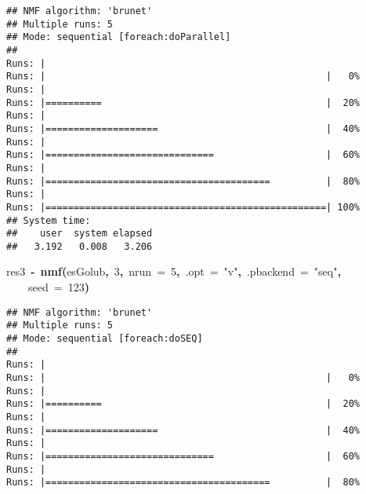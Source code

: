 \documentclass[a4paper]{article}\usepackage{graphicx, color}
\makeatletter
\newcommand{\hlnumber}[1]{\textcolor[rgb]{0,0,0}{#1}}%
\newcommand{\hlfunctioncall}[1]{\textcolor[rgb]{0.501960784313725,0,0.329411764705882}{\textbf{#1}}}%
\newcommand{\hlstring}[1]{\textcolor[rgb]{0.6,0.6,1}{#1}}%
\newcommand{\hlkeyword}[1]{\textcolor[rgb]{0,0,0}{\textbf{#1}}}%
\newcommand{\hlargument}[1]{\textcolor[rgb]{0.690196078431373,0.250980392156863,0.0196078431372549}{#1}}%
\newcommand{\hlassignement}[1]{\textcolor[rgb]{0,0,0}{\textbf{#1}}}%
\newcommand{\hlsymbol}[1]{\textcolor[rgb]{0,0,0}{#1}}%
\newcommand{\hlstd}[1]{\textcolor[rgb]{0,0,0}{#1}}%
\newenvironment{kframe}{%
 \def\FrameCommand##1{\hskip\@totalleftmargin \hskip-\fboxsep
 \colorbox{shadecolor}{##1}\hskip-\fboxsep
     \hskip-\linewidth \hskip-\@totalleftmargin \hskip\columnwidth}%
 \MakeFramed {\advance\hsize-\width
   \@totalleftmargin\z@ \linewidth\hsize
   \@setminipage}}%
 {\par\unskip\endMakeFramed}
\newenvironment{knitrout}{}{} %
\makeatother
\begin{document}
\begin{knitrout}
\begin{kframe}
\begin{flushleft}
\normalfont
\end{flushleft}
\begin{verbatim}
## NMF algorithm: 'brunet'
## Multiple runs: 5
## Mode: sequential [foreach:doParallel]
## 
Runs: |                                                        
Runs: |                                                  |   0%
Runs: |                                                        
Runs: |==========                                        |  20%
Runs: |                                                        
Runs: |====================                              |  40%
Runs: |                                                        
Runs: |==============================                    |  60%
Runs: |                                                        
Runs: |========================================          |  80%
Runs: |                                                        
Runs: |==================================================| 100%
## System time:
##    user  system elapsed 
##   3.192   0.008   3.206 
\end{verbatim}
\begin{flushleft}
\ttfamily\noindent
\hlsymbol{res3}{\ }\hlassignement{\usebox{\hlnormalsizeboxlessthan}-}{\ }\hlfunctioncall{nmf}\hlkeyword{(}\hlsymbol{esGolub}\hlkeyword{,}{\ }\hlnumber{3}\hlkeyword{,}{\ }\hlargument{nrun}{\ }\hlargument{=}{\ }\hlnumber{5}\hlkeyword{,}{\ }\hlargument{.opt}{\ }\hlargument{=}{\ }\hlstring{"{}v"{}}\hlkeyword{,}{\ }\hlargument{.pbackend}{\ }\hlargument{=}{\ }\hlstring{"{}seq"{}}\hlkeyword{,}\hspace*{\fill}\\
\hlstd{}{\ }{\ }{\ }{\ }\hlargument{seed}{\ }\hlargument{=}{\ }\hlnumber{123}\hlkeyword{)}\mbox{}
\normalfont
\end{flushleft}
\begin{verbatim}
## NMF algorithm: 'brunet'
## Multiple runs: 5
## Mode: sequential [foreach:doSEQ]
## 
Runs: |                                                        
Runs: |                                                  |   0%
Runs: |                                                        
Runs: |==========                                        |  20%
Runs: |                                                        
Runs: |====================                              |  40%
Runs: |                                                        
Runs: |==============================                    |  60%
Runs: |                                                        
Runs: |========================================          |  80%

\end{verbatim}
\end{kframe}
\end{knitrout}
\end{document}
